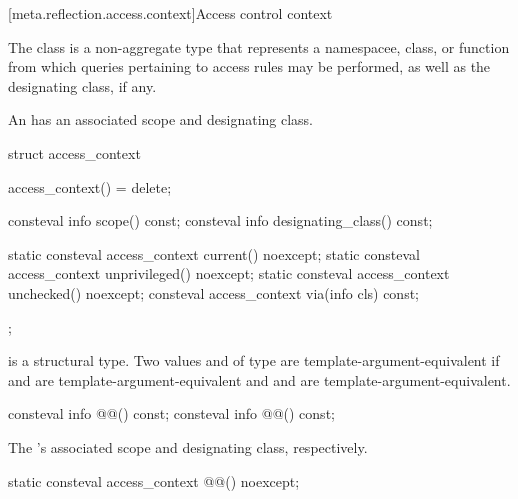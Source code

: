 [meta.reflection.access.context]{Access control context}

\pnum
The  class is a non-aggregate type
that represents a namespacee, class, or function
from which queries pertaining to access rules may be performed,
as well as the designating class, if any.

%
\pnum
An  has an associated scope and designating class.

\begin{itemdecl}
struct access_context {
  access_context() = delete;

  consteval info scope() const;
  consteval info designating_class() const;

  static consteval access_context current() noexcept;
  static consteval access_context unprivileged() noexcept;
  static consteval access_context unchecked() noexcept;
  consteval access_context via(info cls) const;
};
\end{itemdecl}

\begin{itemdescr}
\pnum
{} is a structural type.
Two values  and  of type 
are template-argument-equivalent
if  and 
are template-argument-equivalent
and  and 
are template-argument-equivalent.
\end{itemdescr}

\begin{itemdecl}
consteval info @@() const;
consteval info @@() const;
\end{itemdecl}

\begin{itemdescr}
\pnum
\returns
The 's associated scope
and designating class, respectively.
\end{itemdescr}

\begin{itemdecl}
static consteval access_context @@() noexcept;
\end{itemdecl}

